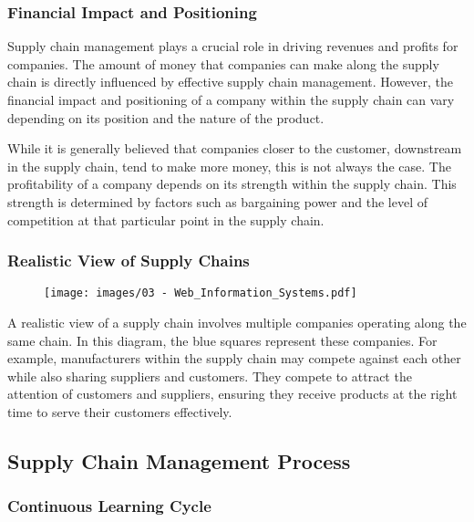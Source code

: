 \subsubsection{Financial Impact and
  Positioning}\label{financial-impact-and-positioning}

Supply chain management plays a crucial role in driving revenues and
profits for companies. The amount of money that companies can make along
the supply chain is directly influenced by effective supply chain
management. However, the financial impact and positioning of a company
within the supply chain can vary depending on its position and the
nature of the product.

While it is generally believed that companies closer to the customer,
downstream in the supply chain, tend to make more money, this is not
always the case. The profitability of a company depends on its strength
within the supply chain. This strength is determined by factors such as
bargaining power and the level of competition at that particular point
in the supply chain.

\subsubsection{Realistic View of Supply
  Chains}\label{realistic-view-of-supply-chains}

\begin{figure}[!h]
  \centering
  \texttt{[image: images/03 - Web\_Information\_Systems.pdf]}
\end{figure}

A realistic view of a supply chain involves multiple companies operating
along the same chain. In this diagram, the blue squares represent these
companies. For example, manufacturers within the supply chain may
compete against each other while also sharing suppliers and customers.
They compete to attract the attention of customers and suppliers,
ensuring they receive products at the right time to serve their
customers effectively.

\subsection{Supply Chain Management
  Process}\label{supply-chain-management-process}

\subsubsection{Continuous Learning Cycle}\label{continuous-learning-cycle}

